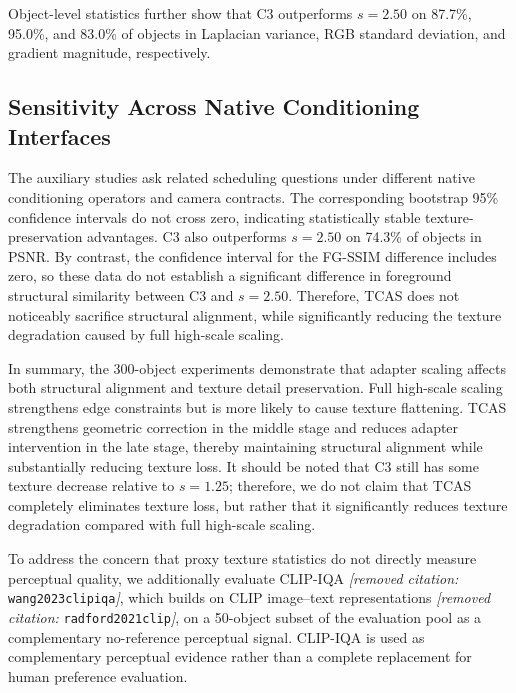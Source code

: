 \documentclass[times,twocolumn,final]{elsarticle}
\providecommand{\DIFadd}[1]{{\protect\color{blue} \sf #1}} %
\providecommand{\DIFdel}[1]{{\protect\color{red} \scriptsize #1}} %
\providecommand{\DIFaddbegin}{} %
\providecommand{\DIFaddend}{} %
\providecommand{\DIFdelbegin}{} %
\providecommand{\DIFdelend}{} %
\begin{document}
\DIFdelbegin \DIFdel{Object-level statistics further show that C3 outperforms $s = 2.50$ on 87.7\%, 95.0\%, and 83.0\% of objects in Laplacian variance, RGB standard deviation, and gradient magnitude, respectively.
}\DIFdelend \DIFaddbegin \subsection{Sensitivity Across Native Conditioning Interfaces}
\label{subsec:cross-interface}
\DIFadd{The auxiliary studies ask related scheduling questions under different native conditioning operators and camera contracts. }\DIFaddend The \DIFdelbegin \DIFdel{corresponding bootstrap 95\% confidence intervals do not cross zero, indicating statistically stable texture-preservation advantages. C3 also outperforms $s = 2.50$ on 74.3\% of objects in PSNR. By contrast, the confidence interval for the FG-SSIM difference includes zero, so these data do not establish a significant difference in foreground structural similarity between C3 and $s = 2.50$. Therefore, TCAS does not noticeably sacrifice structural alignment, while significantly reducing the texture degradation caused by full high-scale scaling. }%

\DIFdel{In summary, the 300-object experiments demonstrate that adapter scaling affects both structural alignment and texture detail preservation. Full high-scale scaling strengthens edge constraints but is more likely to cause texture flattening. TCAS strengthens geometric correction in the middle stage and reduces adapter intervention in the late stage, thereby maintaining structural alignment while substantially reducing texture loss. It should be noted that C3 still has some texture decrease relative to $s = 1.25$; therefore, we do not claim that TCAS completely eliminates texture loss, but rather that it significantly reduces texture degradation compared with full high-scale scaling. }%

\DIFdel{To address the concern that proxy texture statistics do not directly measure perceptual quality, we additionally evaluate CLIP-IQA \textit{[removed citation: }\texttt{wang2023clipiqa}\textit{]}, which builds on CLIP image--text representations \textit{[removed citation: }\texttt{radford2021clip}\textit{]}, on a }\DIFdelend 50-object \DIFdelbegin \DIFdel{subset of the evaluation pool as a complementary no-reference perceptual signal. CLIP-IQA is used as complementary perceptual evidence rather than a complete replacement for human preference evaluation.
}%
\end{document}
